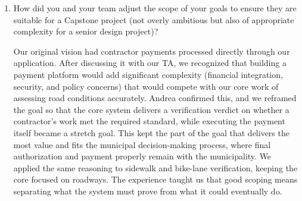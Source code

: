 \documentclass{article}
\begin{document}
\begin{enumerate}
    Our main difficulty was defining the inputs and outputs, because the data we can expect from stakeholders is varied and still uncertain. The municipal partner has not been finalized, and that uncertainty made it hard to pin down scope with confidence. We resolved this by recognizing that the problem statement is meant to capture high-level parameters of the problem, not the implementation of the solution. That let us describe inputs and outputs in terms of what they represent (observed road condition, location, applicable standard) rather than committing to specific formats or sources that may change. It also reminded us that deferring detail is sometimes the right engineering decision rather than avoidance. To handle the questions that remain open, we scheduled a follow-up meeting with Andrea so that future requirements can be clarified as stakeholder data becomes clearer.

    \begin{itemize}
        \item We had initial difficulty separating the problem from the technical solution.
        \item We resolved this by focusing on municipal needs instead of specific technologies.
        \item We found it difficult to set an appropriate scope for the project.
        \item We resolved this by separating core requirements from the stretch goals.
        \item We accounted for different winter maintenance standards between municipalities.
    \end{itemize}

    \item How did you and your team adjust the scope of your goals to ensure
    they are suitable for a Capstone project (not overly ambitious but also of
    appropriate complexity for a senior design project)?
    
    Our original vision had contractor payments processed directly through our application. After discussing it with our TA, we recognized that building a payment platform would add significant complexity (financial integration, security, and policy concerns) that would compete with our core work of assessing road conditions accurately. Andrea confirmed this, and we reframed the goal so that the core system delivers a verification verdict on whether a contractor's work met the required standard, while executing the payment itself became a stretch goal. This kept the part of the goal that delivers the most value and fits the municipal decision-making process, where final authorization and payment properly remain with the municipality. We applied the same reasoning to sidewalk and bike-lane verification, keeping the core focused on roadways. The experience taught us that good scoping means separating what the system must prove from what it could eventually do.


\end{enumerate}
\end{document}
